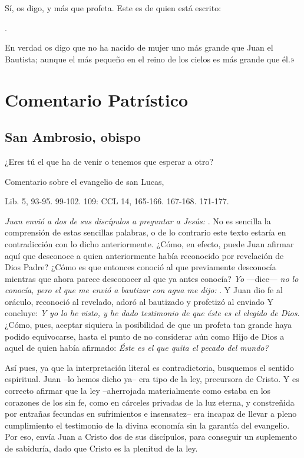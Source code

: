 Sí, os digo, y más que profeta. Este es de quien está escrito:

.

En verdad os digo que no ha nacido de mujer uno más grande que Juan el
Bautista; aunque el más pequeño en el reino de los cielos es más grande
que él.»



\section{Comentario Patrístico}

\subsection{San Ambrosio, obispo}

¿Eres tú el que ha de venir o tenemos que esperar a otro?

Comentario sobre el evangelio de san Lucas,

Lib. 5, 93-95. 99-102. 109: CCL 14, 165-166. 167-168. 171-177.

\emph{Juan envió a dos de sus discípulos a preguntar a Jesús: }. No es sencilla la comprensión de estas sencillas palabras, o de lo contrario este texto estaría en contradicción con lo dicho anteriormente. ¿Cómo, en efecto, puede Juan afirmar aquí que desconoce a quien anteriormente había reconocido por revelación de Dios Padre? ¿Cómo es que entonces conoció al que previamente desconocía mientras que ahora parece desconocer al que ya antes conocía? \emph{Yo} ---dice--- \emph{no lo conocía, pero el que me envió a bautizar con agua me dijo: }. Y Juan dio fe al oráculo, reconoció al revelado, adoró al bautizado y profetizó al enviado Y concluye: \emph{Y yo lo he visto, y he dado testimonio de que éste es el elegido de Dios}. ¿Cómo, pues, aceptar siquiera la posibilidad de que un profeta tan grande haya podido equivocarse, hasta el punto de no considerar aún como Hijo de Dios a aquel de quien había afirmado: \emph{Éste es el que quita el pecado del mundo?}

Así pues, ya que la interpretación literal es contradictoria, busquemos el sentido espiritual. Juan --lo hemos dicho ya-- era tipo de la ley, precursora de Cristo. Y es correcto afirmar que la ley --aherrojada materialmente como estaba en los corazones de los sin fe, como en cárceles privadas de la luz eterna, y constreñida por entrañas fecundas en sufrimientos e insensatez-- era incapaz de llevar a pleno cumplimiento el testimonio de la divina economía sin la garantía del evangelio. Por eso, envía Juan a Cristo dos de sus discípulos, para conseguir un suplemento de sabiduría, dado que Cristo es la plenitud de la ley.

